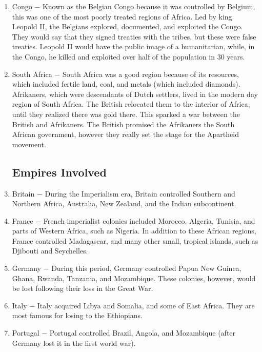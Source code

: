 \documentclass[12pt]{article}
\begin{document}
\begin{enumerate}
\item Congo $-$ Known as the Belgian Congo because it was controlled by Belgium, this was one of the most poorly treated regions of Africa. Led by king Leopold II, the Belgians explored, documented, and exploited the Congo. They would say that they signed treaties with the tribes, but these were false treaties. Leopold II would have the public image of a humanitarian, while, in the Congo, he killed and exploited over half of the population in 30 years. 

\item South Africa $-$ South Africa was a good region because of its resources, which included fertile land, coal, and metals (which included diamonds). Afrikaners, which were descendants of Dutch settlers, lived in the modern day region of South Africa. The British relocated them to the interior of Africa, until they realized there was gold there. This sparked a war between the British and Afrikaners. The British promised the Afrikaners the South African government, however they really set the stage for the Apartheid movement.

\subsection{Empires Involved}

\item Britain $-$ During the Imperialism era, Britain controlled Southern and Northern Africa, Australia, New Zealand, and the Indian subcontinent.

\item France $-$ French imperialist colonies included Morocco, Algeria, Tunisia, and parts of Western Africa, such as Nigeria. In addition to these African regions, France controlled Madagascar, and many other small, tropical islands, such as Djibouti and Seychelles.

\item Germany $-$ During this period, Germany controlled Papua New Guinea, Ghana, Rwanda, Tanzania, and Mozambique. These colonies, however, would be lost following their loss in the Great War.

\item Italy $-$ Italy acquired Libya and Somalia, and some of East Africa. They are most famous for losing to the Ethiopians.

\item Portugal $-$ Portugal controlled Brazil, Angola, and Mozambique (after Germany lost it in the first world war).


\end{enumerate}
\end{document}
